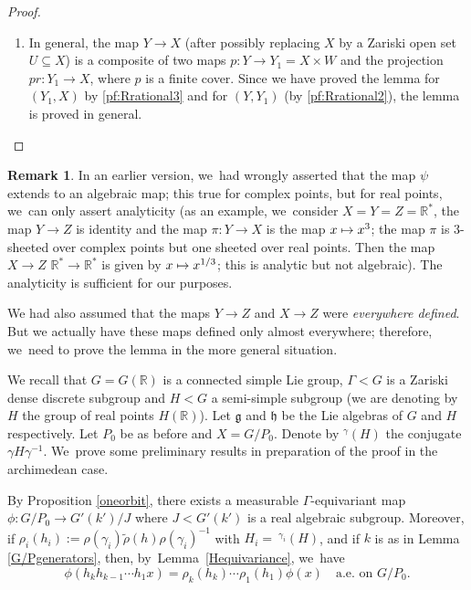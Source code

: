 \documentclass[JEP,XML,SOM,Unicode,published]{cedram}
\def\mto{\mathchoice{\longmapsto}{\mapsto}{\mapsto}{\mapsto}}
\theoremstyle{definition}
\newtheorem{remark}{Remark}
\newcommand{\field}[1]{\mathbb{#1}}
\newcommand{\R}{\field{R}}
\let\g\gamma
\let\G\Gamma
\newcommand{\frg}{\mathfrak g}
\newcommand{\fh}{\mathfrak h}
\begin{document}
\begin{proof}
\begin{enumerate}
The image of $E\subseteq Y(\R)=X(\R)\times W(\R)$ in $X(\R)$ may not be- a priori- measurable. However, the set $F=\{x \in X(\R): \phi(x)=\psi (x)\}$ is measurable and its inverse image $\pi ^{-1}(F)$ contains the set $E$. Since $E$ is co-null, it~follows that $\pi ^{-1}(F)$ is co-null and hence $F$ is co-null. That is, $\phi=\psi$ a.e. on $(X(\R), \mu)$.

\item\label{pf:Rrational4}
In general, the map $Y \to X$ (after possibly replacing $X$ by a Zariski open set $U\subseteq X$) is a composite of two maps $p: Y \to Y_1=X\times W$ and the projection $pr: Y_1 \to X$, where $p$ is a finite cover. Since we have proved the lemma for $(Y_1,X)$ by \eqref{pf:Rrational3} and for $(Y,Y_1)$ (by \eqref{pf:Rrational2}), the lemma is proved in general.\qedhere
\end{enumerate}
\end{proof}

\begin{remark}
In an earlier version, we~had wrongly asserted that the map $\psi$ extends to an algebraic map; this true for complex points, but for real points, we~can only assert analyticity (as an example, we~consider $X=Y=Z =\R^*$, the map $Y\to Z$ is identity and the map $\pi: Y\to X$ is the map $x\mto x^3$; the map $\pi$ is 3-sheeted over complex points but one sheeted over real points. Then the map $X\to Z$ \ie $\R ^* \to \R^* $ is given by $ x \mto x^{1/3}$; this is analytic but not algebraic). The analyticity is sufficient for our purposes.

We had also assumed that the maps $Y \to Z$ and $X\to Z$ were \emph{everywhere defined}. But we actually have these maps defined only almost everywhere; therefore, we~need to prove the lemma in the more general situation.
\end{remark}

We recall that $G=G(\R)$ is a connected simple Lie group, $\G < G$ is a Zariski dense discrete subgroup and $H< G$ a semi-simple subgroup (we are denoting by $H$ the group of real points $H(\R)$). Let $\frg$ and $\fh$ be the Lie algebras of $G$ and $H$ respectively. Let $P_0$ be as before and $X=G/P_0$. Denote by $^{\g}(H)$ the conjugate $\g H \g ^{-1}$. We~prove some preliminary results in preparation of the proof in the archimedean case.

By Proposition \ref{oneorbit}, there exists a measurable $\G$-equivariant map $\phi : G/P_0 \to G'(k')/J$ where $J< G'(k')$ is a real algebraic subgroup. Moreover, if $\rho_i (h_i):=\rho (\g_i)\tilde \rho (h) \rho (\g_i)^{-1}$ with $H_i={\ }^{\g_i}(H)$, and if $k$ is as in Lemma \ref{G/Pgenerators}, then, by~Lemma~\ref{Hequivariance}, we~have
\[
\phi (h_kh_{k-1}\cdots h_1x)=\rho_k(h_k)\cdots \rho_1(h_1)\phi (x) \quad \text{a.e. on $G/P_0$.}
\]
\end{document}
